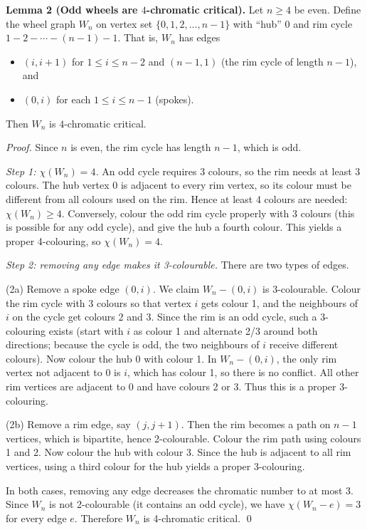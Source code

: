 \medskip
\textbf{Lemma 2 (Odd wheels are $4$-chromatic critical).}
Let $n\ge 4$ be even. Define the wheel graph $W_n$ on vertex set
$\{0,1,2,\dots,n-1\}$ with ``hub'' $0$ and rim cycle $1-2-\cdots-(n-1)-1$.
That is, $W_n$ has edges
\begin{itemize}
\item $(i,i+1)$ for $1\le i\le n-2$ and $(n-1,1)$ (the rim cycle of length $n-1$), and
\item $(0,i)$ for each $1\le i\le n-1$ (spokes).
\end{itemize}
Then $W_n$ is $4$-chromatic critical.

\emph{Proof.}
Since $n$ is even, the rim cycle has length $n-1$, which is odd.

\emph{Step 1: $\chi(W_n)=4$.}
An odd cycle requires 3 colours, so the rim needs at least 3 colours.
The hub vertex $0$ is adjacent to every rim vertex, so its colour must be different from all colours used on the rim.
Hence at least 4 colours are needed: $\chi(W_n)\ge 4$.
Conversely, colour the odd rim cycle properly with 3 colours (this is possible for any odd cycle), and give the hub a fourth colour.
This yields a proper 4-colouring, so $\chi(W_n)=4$.

\emph{Step 2: removing any edge makes it 3-colourable.}
There are two types of edges.

(2a) Remove a spoke edge $(0,i)$.
We claim $W_n-(0,i)$ is 3-colourable.
Colour the rim cycle with 3 colours so that vertex $i$ gets colour 1, and the neighbours of $i$ on the cycle get colours 2 and 3.
Since the rim is an odd cycle, such a 3-colouring exists (start with $i$ as colour 1 and alternate 2/3 around both directions; because the cycle is odd, the two neighbours of $i$ receive different colours).
Now colour the hub $0$ with colour 1.
In $W_n-(0,i)$, the only rim vertex not adjacent to $0$ is $i$, which has colour 1, so there is no conflict.
All other rim vertices are adjacent to $0$ and have colours 2 or 3.
Thus this is a proper 3-colouring.

(2b) Remove a rim edge, say $(j,j+1)$.
Then the rim becomes a path on $n-1$ vertices, which is bipartite, hence 2-colourable.
Colour the rim path using colours 1 and 2.
Now colour the hub with colour 3.
Since the hub is adjacent to all rim vertices, using a third colour for the hub yields a proper 3-colouring.

In both cases, removing any edge decreases the chromatic number to at most 3.
Since $W_n$ is not 2-colourable (it contains an odd cycle), we have $\chi(W_n-e)=3$ for every edge $e$.
Therefore $W_n$ is 4-chromatic critical.
\qed


